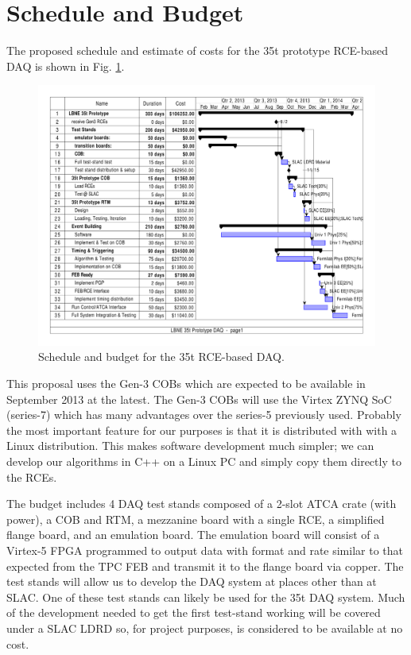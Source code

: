 \section{Schedule and Budget}

The proposed schedule and estimate of costs for the 35t prototype RCE-based DAQ is shown in Fig. \ref{fig:budget35t}.  

\begin{figure}[htb]
\includegraphics[scale=0.8,angle=90]{project-gantt.pdf}
\caption{Schedule and budget for the 35t RCE-based DAQ.}
\label{fig:budget35t}
\end{figure} 

This proposal uses the Gen-3 COBs which are expected to be available in September 
2013 at the latest.  The Gen-3 COBs will use the Virtex ZYNQ SoC (series-7) which has many advantages over the series-5 previously used.  Probably the most important feature for our purposes is that it is distributed with with a Linux distribution.  This makes software development much simpler; we can develop our algorithms in C++ on a Linux PC and simply copy them directly to the RCEs.  

The budget includes 4 DAQ test stands composed of a 2-slot ATCA crate (with power), a COB and RTM, a mezzanine board with a single RCE, a simplified flange board, and an emulation board.  The emulation board will consist of a Virtex-5 FPGA programmed to output data with format and rate  similar to that expected from the TPC FEB and transmit it to the flange board via copper.  The test stands will allow us to develop the DAQ system at places other than at SLAC.  One of these test stands can likely be used for the 35t DAQ system.    Much of the development needed to get the first test-stand working will be covered under a SLAC LDRD so, for project purposes, is considered to be available at no cost.  

